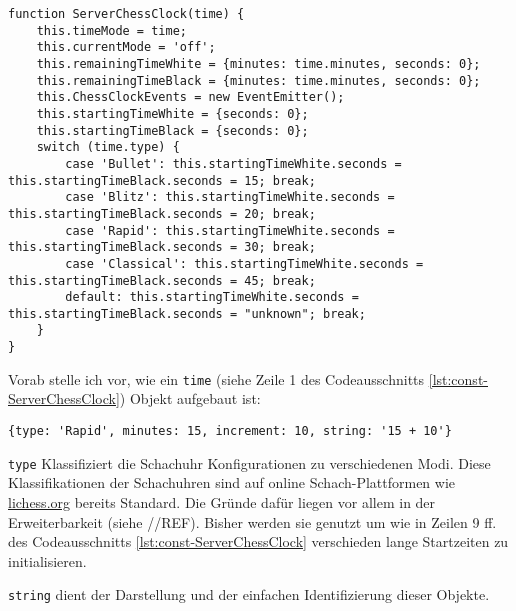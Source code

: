 \begin{lstlisting}[style=codeStyle, caption={Konstruktor der ServerChessClock Klasse}, label={lst:const-ServerChessClock}]
function ServerChessClock(time) {
    this.timeMode = time;
    this.currentMode = 'off';
    this.remainingTimeWhite = {minutes: time.minutes, seconds: 0};
    this.remainingTimeBlack = {minutes: time.minutes, seconds: 0};
    this.ChessClockEvents = new EventEmitter();
    this.startingTimeWhite = {seconds: 0};
    this.startingTimeBlack = {seconds: 0};
    switch (time.type) {
        case 'Bullet': this.startingTimeWhite.seconds = this.startingTimeBlack.seconds = 15; break;
        case 'Blitz': this.startingTimeWhite.seconds = this.startingTimeBlack.seconds = 20; break;
        case 'Rapid': this.startingTimeWhite.seconds = this.startingTimeBlack.seconds = 30; break;
        case 'Classical': this.startingTimeWhite.seconds = this.startingTimeBlack.seconds = 45; break;
        default: this.startingTimeWhite.seconds = this.startingTimeBlack.seconds = "unknown"; break;
    }
}
\end{lstlisting}

Vorab stelle ich vor, wie ein \verb|time| (siehe Zeile 1 des Codeausschnitts \ref{lst:const-ServerChessClock}) Objekt aufgebaut ist:
\begin{verbatim}
{type: 'Rapid', minutes: 15, increment: 10, string: '15 + 10'}
\end{verbatim}
\verb|type| Klassifiziert die Schachuhr Konfigurationen zu verschiedenen Modi. Diese Klassifikationen der Schachuhren sind auf online Schach-Plattformen wie \url{lichess.org} bereits Standard. Die Gründe dafür liegen vor allem in der Erweiterbarkeit (siehe //REF). Bisher werden sie genutzt um wie in Zeilen 9 ff. des Codeausschnitts \ref{lst:const-ServerChessClock} verschieden lange Startzeiten zu initialisieren.

\verb|string| dient der Darstellung und der einfachen Identifizierung dieser Objekte.

